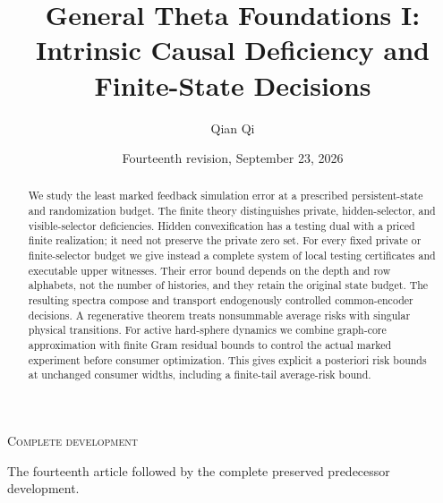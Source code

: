 
\newcommand{\Wone}{W_1}
\newcommand{\Del}{\Delta}
\newcommand{\emptyw}{\varnothing}
\newcommand{\osc}{\operatorname{osc}}
\newcommand{\diam}{\operatorname{diam}}
\newcommand{\Lipone}{\operatorname{Lip}_1}
\newcommand{\aff}{\operatorname{aff}}
\newcommand{\conv}{\operatorname{conv}}
\newcommand{\rplus}{\operatorname{rank}_{+}}
\newcommand{\dpr}{\delta^{\rm p}}
\newcommand{\dhi}{\delta^{\rm h}}
\newcommand{\dvi}{\delta^{\rm v}}
\newcommand{\dmix}{\delta^{\rm mix}}
\newcommand{\cK}{\mathcal K}
\newcommand{\cB}{\mathcal B}
\newcommand{\cI}{\mathcal I}
\title[General Theta Foundations I]{General Theta Foundations I:\\Intrinsic Causal Deficiency and Finite-State Decisions}
\author{Qian Qi}
\date{Fourteenth revision, September 23, 2026}

\begin{abstract}
We study the least marked feedback simulation error at a prescribed
persistent-state and randomization budget. The finite theory distinguishes
private, hidden-selector, and visible-selector deficiencies. Hidden
convexification has a testing dual with a priced finite realization;
it need not preserve the private zero set. For every fixed private or
finite-selector budget we give instead a complete system of local testing
certificates and executable upper witnesses. Their error bound depends on
the depth and row alphabets, not the number of histories, and they retain
the original state budget. The resulting spectra compose and transport
endogenously controlled common-encoder decisions. A regenerative theorem
treats nonsummable average risks with singular physical transitions.
For active hard-sphere dynamics we combine graph-core approximation with
finite Gram residual bounds to control the actual marked experiment before
consumer optimization. This gives explicit a posteriori risk bounds at
unchanged consumer widths, including a finite-tail average-risk bound.
\end{abstract}
\maketitle
\enlargethispage{4pt}
\ifcomplete
\begin{center}\small\textsc{Complete development}\par
The fourteenth article followed by the complete preserved predecessor development.
\end{center}
\fi
\tableofcontents
